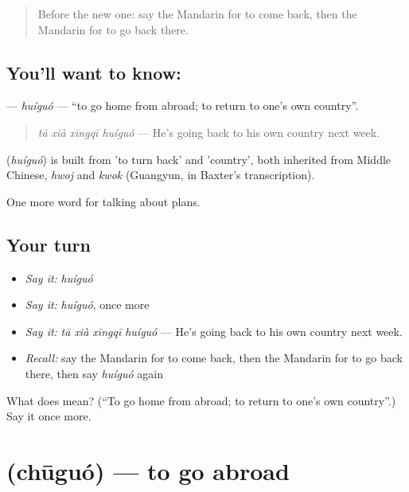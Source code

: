 \begin{quote}
Before the new one: say the Mandarin for to come back, then the Mandarin for to go back there.
\end{quote}

\subsection*{You'll want to know: }
\textbf{} — \emph{huíguó} — \textquotedblleft{}to go home from abroad; to return to one's own country\textquotedblright{}.

\begin{quote}
\textbf{} \emph{tā xià xīngqī huíguó} — He's going back to his own country next week.
\end{quote}

\begin{cousinweb}
\textbf{} (\emph{huíguó}) is built from  'to turn back' and  'country', both inherited from Middle Chinese, \emph{hwoj} and \emph{kwok} (Guangyun, in Baxter's transcription).
\end{cousinweb}

\begin{grammarlens}[title={What you've built}]
One more word for talking about plans.
\end{grammarlens}

\subsection*{Your turn}
\begin{itemize}
\raggedright
  \item \emph{Say it:} \emph{huíguó}
  \item \emph{Say it:} \emph{huíguó}, once more
  \item \emph{Say it:} \emph{tā xià xīngqī huíguó} — He's going back to his own country next week.
  \item \emph{Recall:} say the Mandarin for to come back, then the Mandarin for to go back there, then say \emph{huíguó} again
\end{itemize}

\begin{tcolorbox}[breakable,colback=teal!4,colframe=teal!35!black,title={Before you move on}]
What does  mean? (\textquotedblleft{}To go home from abroad; to return to one's own country\textquotedblright{}.) Say it once more.
\end{tcolorbox}
\section[\texorpdfstring{\zh{出国} (chūguó)}{出国 (chūguó)}]{ (chūguó) — to go abroad}

